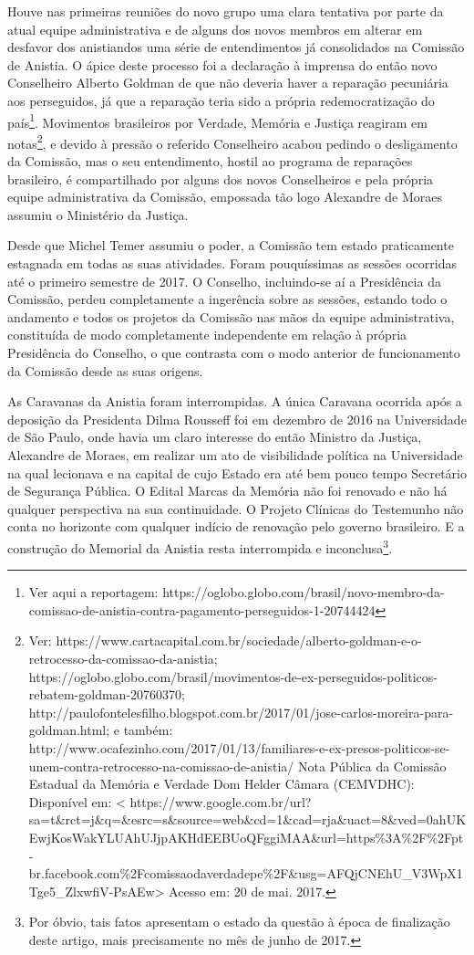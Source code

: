 Houve nas primeiras reuniões do novo grupo uma clara tentativa por parte
da atual equipe administrativa e de alguns dos novos membros em alterar
em desfavor dos anistiandos uma série de entendimentos já consolidados
na Comissão de Anistia. O ápice deste processo foi a declaração à
imprensa do então novo Conselheiro Alberto Goldman de que não deveria
haver a reparação pecuniária aos perseguidos, já que a reparação teria
sido a própria redemocratização do país\footnote{Ver aqui a reportagem:
  https://oglobo.globo.com/brasil/novo-membro-da-comissao-de-anistia-contra-pagamento-perseguidos-1-20744424}.
Movimentos brasileiros por Verdade, Memória e Justiça reagiram em
notas\footnote{Ver:
  https://www.cartacapital.com.br/sociedade/alberto-goldman-e-o-retrocesso-da-comissao-da-anistia;
  https://oglobo.globo.com/brasil/movimentos-de-ex-perseguidos-politicos-rebatem-goldman-20760370;
  http://paulofontelesfilho.blogspot.com.br/2017/01/jose-carlos-moreira-para-goldman.html;
  e também:
  http://www.ocafezinho.com/2017/01/13/familiares-e-ex-presos-politicos-se-unem-contra-retrocesso-na-comissao-de-anistia/
  Nota Pública da Comissão Estadual da Memória e Verdade Dom Helder
  Câmara (CEMVDHC): Disponível em: \textless{}
  https://www.google.com.br/url?sa=t\&rct=j\&q=\&esrc=s\&source=web\&cd=1\&cad=rja\&uact=8\&ved=0ahUKEwjKosWakYLUAhUJjpAKHdEEBUoQFggiMAA\&url=https\%3A\%2F\%2Fpt-br.facebook.com\%2Fcomissaodaverdadepe\%2F\&usg=AFQjCNEhU\_V3WpX1Tge5\_ZlxwfiV-PsAEw\textgreater{}
  Acesso em: 20 de mai. 2017.}, e devido à pressão o referido
Conselheiro acabou pedindo o desligamento da Comissão, mas o seu
entendimento, hostil ao programa de reparações brasileiro, é
compartilhado por alguns dos novos Conselheiros e pela própria equipe
administrativa da Comissão, empossada tão logo Alexandre de Moraes
assumiu o Ministério da Justiça.

Desde que Michel Temer assumiu o poder, a Comissão tem estado
praticamente estagnada em todas as suas atividades. Foram pouquíssimas
as sessões ocorridas até o primeiro semestre de 2017. O Conselho,
incluindo-se aí a Presidência da Comissão, perdeu completamente a
ingerência sobre as sessões, estando todo o andamento e todos os
projetos da Comissão nas mãos da equipe administrativa, constituída de
modo completamente independente em relação à própria Presidência do
Conselho, o que contrasta com o modo anterior de funcionamento da
Comissão desde as suas origens.

As Caravanas da Anistia foram interrompidas. A única Caravana ocorrida
após a deposição da Presidenta Dilma Rousseff foi em dezembro de 2016 na
Universidade de São Paulo, onde havia um claro interesse do então
Ministro da Justiça, Alexandre de Moraes, em realizar um ato de
visibilidade política na Universidade na qual lecionava e na capital de
cujo Estado era até bem pouco tempo Secretário de Segurança Pública. O
Edital Marcas da Memória não foi renovado e não há qualquer perspectiva
na sua continuidade. O Projeto Clínicas do Testemunho não conta no
horizonte com qualquer indício de renovação pelo governo brasileiro. E a
construção do Memorial da Anistia resta interrompida e
inconclusa\footnote{Por óbvio, tais fatos apresentam o estado da questão
  à época de finalização deste artigo, mais precisamente no mês de junho
  de 2017.}.

